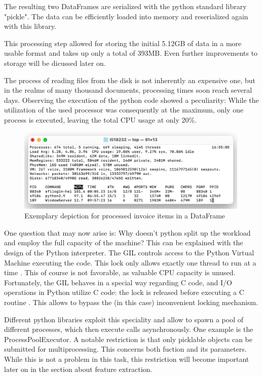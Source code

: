 	The resulting two DataFrames are serialized with the python standard library "pickle".  The data can be efficiently loaded into memory and reserialized again with this library.
	
	This processing step allowed for storing the initial 5.12GB of data in a more usable format and takes up only a total of 393MB. Even further improvements to storage will be dicussed later on.

	The process of reading files from the disk is not inherently an expensive one, but in the realms of many thousand documents, processing times soon reach several days. Observing the execution of the python code showed a peculiarity: While the utilization of the used processor was consequently at the maximum, only one process is executed, leaving the total CPU usage at only 20\%. 
	
	\begin{figure}[ht]
		\centering
		\includegraphics[height=4cm]{Bilder/practical/python_processes.png}
		\caption{Exemplary depiction for processed invoice items in a DataFrame}
		\label{fig:df-invoices}
	\end{figure}
	
	
	One question that may now arise is: Why doesn't python split up the workload and employ the full capacity of the machine?
	This can be explained with the design of the Python interpreter. The \ac{GIL} controls access to the Python Virtual Machine executing the code. This lock only allows exactly one thread to run at a time \cite{corePython}. This of course is not favorable, as valuable CPU capacity is unused. Fortunately, the \ac{GIL} behaves in a special way regarding C code, and I/O operations in Python utilize C code: the lock is released before executing a C routine \cite{corePython}. This allows to bypass the (in this case) inconvenient locking mechanism. 
	
	Different python libraries exploit this speciality and allow to spawn a pool of different processes, which then execute calls asynchronously. One example is the ProcessPoolExecutor. A notable restriction is that only picklable objects can be submitted for multiprocessing. This concerns both fuction and its parameters. While this is not a problem in this task, this restriction will become important later on in the section about feature extraction.
	
